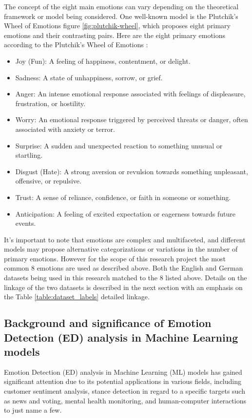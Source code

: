 \documentclass[11pt]{article}
\begin{document}
The concept of the eight main emotions can vary depending on the theoretical framework or model being considered. One well-known model is the Plutchik's Wheel of Emotions figure \ref{fig:plutchik-wheel}, which proposes eight primary emotions and their contrasting pairs. Here are the eight primary emotions according to the Plutchik's Wheel of Emotions \cite{Tromp}:

\begin{itemize}
\item Joy (Fun): A feeling of happiness, contentment, or delight.
\item Sadness: A state of unhappiness, sorrow, or grief.
\item Anger: An intense emotional response associated with feelings of displeasure, frustration, or hostility.
\item Worry: An emotional response triggered by perceived threats or danger, often associated with anxiety or terror.
\item Surprise: A sudden and unexpected reaction to something unusual or startling.
\item Disgust (Hate): A strong aversion or revulsion towards something unpleasant, offensive, or repulsive.
\item Trust: A sense of reliance, confidence, or faith in someone or something.
\item Anticipation: A feeling of excited expectation or eagerness towards future events.
\end{itemize}
It's important to note that emotions are complex and multifaceted, and different models may propose alternative categorizations or variations in the number of primary emotions. However for the scope of this research project the most common 8 emotions are used as described above. Both the English and German datasets being used in this research matched to the 8 listed above. Details on the linkage of the two datasets is described in the next section with an emphasis on the Table \ref{table:dataset_labels} detailed linkage.

\subsection{Background and significance of Emotion Detection (ED) analysis in Machine Learning models}
Emotion Detection (ED) analysis in Machine Learning (ML) models has gained significant attention due to its potential applications in various fields, including customer sentiment analysis, stance detection in regard to a specific targets such as news and voting\cite{mascarell-etal-2021-stance}, mental health monitoring\cite{Colonnello}, and human-computer interactions to just name a few.
\end{document}
